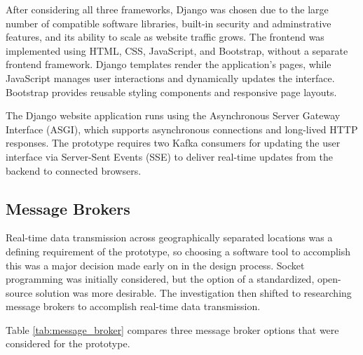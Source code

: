 \documentclass[12pt]{article}
\begin{document}
  After considering all three frameworks, Django was chosen due to the large number of compatible software libraries, built-in security and adminstrative features, and its ability to scale as website traffic grows. The frontend was implemented using HTML, CSS, JavaScript, and Bootstrap, without a separate frontend framework. Django templates render the application's pages, while JavaScript manages user interactions and dynamically updates the interface. Bootstrap provides reusable styling components and responsive page layouts.

The Django website application runs using the Asynchronous Server Gateway Interface (ASGI), which supports asynchronous connections and long-lived HTTP responses. The prototype requires two Kafka consumers for updating the user interface via Server-Sent Events (SSE) to deliver real-time updates from the backend to connected browsers.
  
\subsection*{Message Brokers}

  Real-time data transmission across geographically separated locations was a defining requirement of the prototype, so choosing a software tool to accomplish this was a major decision made early on in the design process. Socket programming was initially considered, but the option of a standardized, open-source solution was more desirable. The investigation then shifted to researching message brokers to accomplish real-time data transmission.

Table \ref{tab:message_broker} compares three message broker options that were considered for the prototype.
\end{document}
